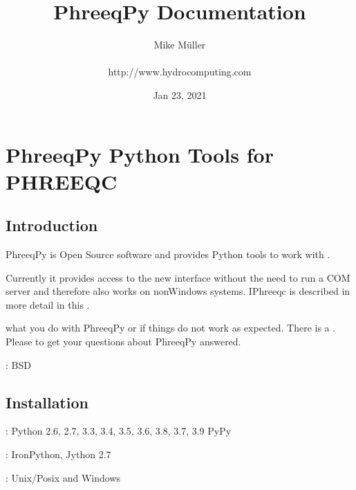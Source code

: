 \documentclass[letterpaper,10pt,english]{sphinxmanual}
\title{PhreeqPy Documentation}
\date{Jan 23, 2021}
\author{Mike Müller\\\\ http://www.hydrocomputing.com}
\begin{document}
\pagestyle{empty}
\sphinxmaketitle
\pagestyle{plain}
\sphinxtableofcontents
\pagestyle{normal}
\label{\detokenize{contents::doc}}



\chapter{PhreeqPy \sphinxhyphen{} Python Tools for PHREEQC}
\label{\detokenize{index:phreeqpy-python-tools-for-phreeqc}}\label{\detokenize{index::doc}}

\section{Introduction}
\label{\detokenize{index:introduction}}
PhreeqPy is Open Source software and provides Python tools to work with
.

Currently it provides access to the new  interface without the need to
run a COM server and therefore also works on non\sphinxhyphen{}Windows systems.
IPhreeqc is described in more detail in this .

 what you do with PhreeqPy or if things do not work
as expected. There is a
.
Please  to get your questions about PhreeqPy answered.


: BSD


\section{Installation}
\label{\detokenize{index:installation}}\label{\detokenize{index:id1}}
: Python 2.6, 2.7, 3.3, 3.4, 3.5, 3.6, 3.8, 3.7, 3.9 PyPy

: IronPython, Jython 2.7

: Unix/Posix and Windows
\end{document}
